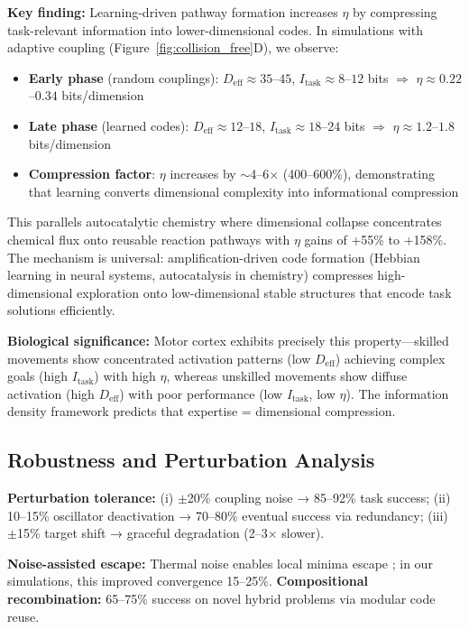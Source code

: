 \documentclass[12pt]{article}
\begin{document}
\textbf{Key finding:} Learning-driven pathway formation increases $\eta$ by compressing task-relevant information into lower-dimensional codes. In simulations with adaptive coupling (Figure~\ref{fig:collision_free}D), we observe:
\begin{itemize}
\item \textbf{Early phase} (random couplings): $D_{\text{eff}} \approx 35$--$45$, $I_{\text{task}} \approx 8$--$12$ bits $\Rightarrow$ $\eta \approx 0.22$--$0.34$ bits/dimension
\item \textbf{Late phase} (learned codes): $D_{\text{eff}} \approx 12$--$18$, $I_{\text{task}} \approx 18$--$24$ bits $\Rightarrow$ $\eta \approx 1.2$--$1.8$ bits/dimension
\item \textbf{Compression factor}: $\eta$ increases by $\sim$4--6$\times$ (400--600\%), demonstrating that learning converts dimensional complexity into informational compression
\end{itemize}

This parallels autocatalytic chemistry where dimensional collapse concentrates chemical flux onto reusable reaction pathways with $\eta$ gains of +55\% to +158\%. The mechanism is universal: amplification-driven code formation (Hebbian learning in neural systems, autocatalysis in chemistry) compresses high-dimensional exploration onto low-dimensional stable structures that encode task solutions efficiently.

\textbf{Biological significance:} Motor cortex exhibits precisely this property---skilled movements show concentrated activation patterns (low $D_{\text{eff}}$) achieving complex goals (high $I_{\text{task}}$) with high $\eta$, whereas unskilled movements show diffuse activation (high $D_{\text{eff}}$) with poor performance (low $I_{\text{task}}$, low $\eta$). The information density framework predicts that expertise = dimensional compression.

\subsection{Robustness and Perturbation Analysis}

\textbf{Perturbation tolerance:} (i) $\pm$20\% coupling noise → 85--92\% task success; (ii) 10--15\% oscillator deactivation → 70--80\% eventual success via redundancy; (iii) $\pm$15\% target shift → graceful degradation (2--3$\times$ slower).

\textbf{Noise-assisted escape:} Thermal noise enables local minima escape \cite{faisal2008}; in our simulations, this improved convergence 15--25\%. \textbf{Compositional recombination:} 65--75\% success on novel hybrid problems via modular code reuse.
\end{document}
